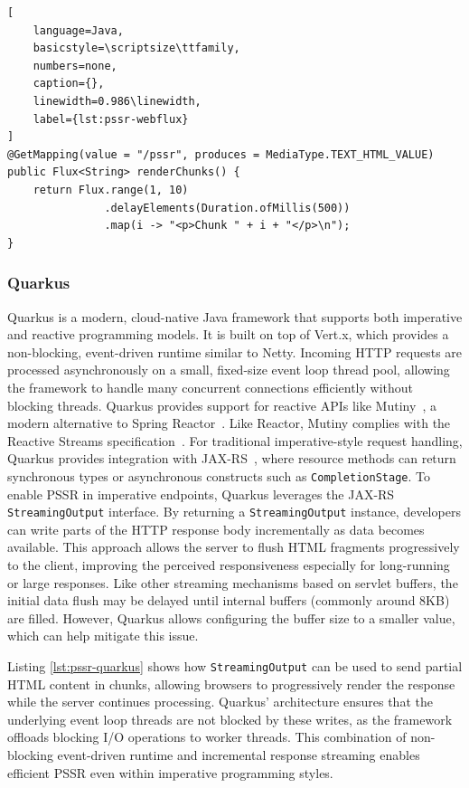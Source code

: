 \documentclass[software,article,accept,pdftex,moreauthors]{Definitions/mdpi}
\begin{document}
\begin{listing}[H]
\caption{Progressive Server-Side Rendering in Spring WebFlux.}
\begin{lstlisting}[
    language=Java,
    basicstyle=\scriptsize\ttfamily,
    numbers=none,
    caption={},
    linewidth=0.986\linewidth,
    label={lst:pssr-webflux}
]
@GetMapping(value = "/pssr", produces = MediaType.TEXT_HTML_VALUE)
public Flux<String> renderChunks() {
    return Flux.range(1, 10)
               .delayElements(Duration.ofMillis(500))
               .map(i -> "<p>Chunk " + i + "</p>\n");
}
\end{lstlisting}
\end{listing}

\subsubsection{Quarkus}

Quarkus is a modern, cloud-native Java framework that supports both imperative
and reactive programming models. It is built on top of Vert.x, which provides a
non-blocking, event-driven runtime similar to Netty. Incoming HTTP requests are
processed asynchronously on a small, fixed-size event loop thread pool,
allowing the framework to handle many concurrent connections efficiently
without blocking threads. Quarkus provides support for reactive APIs like
Mutiny~\cite{mutiny2021}, a modern alternative to Spring
Reactor~\cite{projectreactor}. Like Reactor, Mutiny complies with the Reactive
Streams specification~\cite{ReactiveStreams}. For traditional imperative-style
request handling, Quarkus provides integration with
JAX-RS~\cite{burke2013restful}, where resource methods can return synchronous
types or asynchronous constructs such as \texttt{CompletionStage}. To enable
PSSR in imperative endpoints, Quarkus leverages the JAX-RS
\texttt{StreamingOutput} interface. By returning a \texttt{StreamingOutput}
instance, developers can write parts of the HTTP response body incrementally as
data becomes available. This approach allows the server to flush HTML fragments
progressively to the client, improving the perceived responsiveness especially
for long-running or large responses. Like other streaming mechanisms
based on servlet buffers, the initial data flush may be delayed until internal
buffers (commonly around 8KB) are filled. However, Quarkus allows configuring
the buffer size to a smaller value, which can help mitigate this issue.



Listing \ref{lst:pssr-quarkus} shows how \texttt{StreamingOutput} can be used to send
partial HTML content in chunks, allowing browsers to progressively render the
response while the server continues processing. Quarkus’ architecture ensures
that the underlying event loop threads are not blocked by these writes, as the
framework offloads blocking I/O operations to worker threads. This combination
of non-blocking event-driven runtime and incremental response streaming enables
efficient PSSR even within imperative programming styles.
\end{document}
